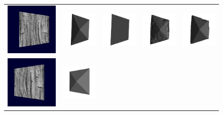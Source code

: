 \begin{figure}[th]
\setlength{\tabcolsep}{1px}
\centering
\begin{tabular}{ccccc}
\includegraphics[height=0.18\textwidth]{./img/datasetSweepIMG0}&
\includegraphics[height=0.18\textwidth]{./img/synthGT1}&
\includegraphics[height=0.18\textwidth]{./img/synthInit1}&
\includegraphics[height=0.18\textwidth]{./img/synthNOtRef1}&
\includegraphics[height=0.18\textwidth]{./img/synthRef1}\\
\includegraphics[height=0.18\textwidth]{./img/datasetSweepIMG1synth2}&
\includegraphics[height=0.18\textwidth]{./img/synth2_GT}&

\end{tabular}
\end{figure}
